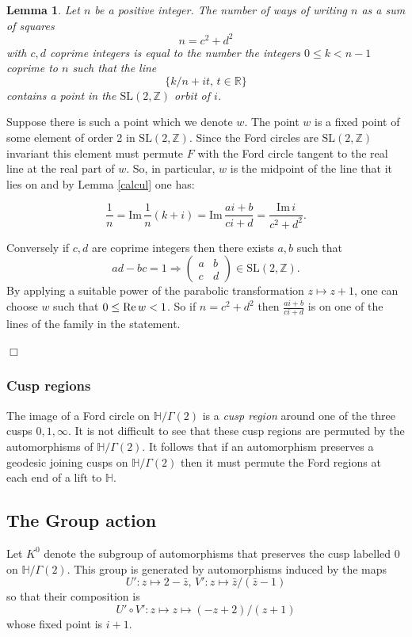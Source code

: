 \documentclass[12pt,a4paper]{amsart}
\newtheorem{lem}[thm]{Lemma}
\def\HH{\mathbb{H}}
\def\im{\mathrm{Im}\,}
\def\xx{\HH/g2}
\def\ZZ{\mathbb{Z}}
\def\RR{\mathbb{R}}
\def\sl2{\mathrm{SL}(2, \ZZ)}
\def\g2{\Gamma(2)}
\def\xx{\HH/\g2}
\begin{document}
\begin{lem} \label{squares}
Let $n$ be a positive integer.
The number of  ways of writing $n$  as a  sum of squares
$$n = c^2 + d^2$$
with $c,d$ coprime integers
is equal to the number the  integers $0 \leq k < n-1$ coprime to $n$
such that the line
$$\{  k/n + i t,\, t \in \RR \}$$
contains  a point in the $\sl2$  orbit of $i$.
\end{lem}


\proof  Suppose there is such  a point which we denote  $w$.
The point $w$ is a fixed point of some  element of order 2 in $\sl2$.
Since the Ford circles are $\sl2$ invariant
this element must permute $F$ with the Ford circle tangent 
to the real line  at the real part of $w$.
So, in particular, $w$ is the midpoint of the line 
that it lies on 
and by  Lemma \ref{calcul} one has:

$$\frac{1}{n} = \im \frac{1 }{n}(k + i)  
= \im  \frac{ai +b}{ci+d }
= \frac{\im i} {c^2 + d^2}.$$

Conversely if $c,d$ are coprime integers 
 then there exists $a,b$ such that
 $$ad - bc = 1 \Rightarrow  
 \begin{pmatrix}
 a & b \\
 c & d
 \end{pmatrix} \in \sl2.
$$
By applying a suitable power of the parabolic transformation 
$z \mapsto z + 1$,
one can choose $w$ such that $0 \leq \text{Re\,} w < 1$.
So if $n = c^2 + d^2$ then $\frac{ai +b}{ci+d }$
is on one of the lines of the family in the statement.

\hfill $\Box$

\subsubsection{Cusp regions}

The image of a Ford circle on $\xx$ is a \textit{cusp region}
around one of the three cusps $0,1,\infty$.
It is not difficult to see that these cusp regions 
are permuted by the automorphisms of $\xx$.
It follows that if an automorphism preserves a geodesic  joining cusps on $\xx$
then it must permute the Ford regions at each end of a lift to $\HH$.

\subsection{The Group action}

Let  $K^0$ denote 
the subgroup of automorphisms 
that preserves the cusp labelled $0$ on $\xx$.
This group is generated by  automorphisms induced by the maps
$$U': z \mapsto 2-\bar{z},\, V' : z \mapsto \bar{z}/(\bar{z} - 1)$$
so that  their composition is 
$$U'\circ V' : z \mapsto z \mapsto (-z + 2) /( z + 1)$$
whose fixed point is $i+1$.
\end{document}
